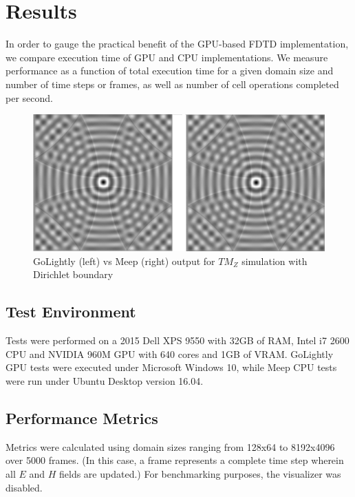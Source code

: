 \chapter{Results} \label{ch:conclusions}

In order to gauge the practical benefit of the GPU-based FDTD implementation, we compare execution time  of GPU and CPU implementations. We measure performance as a function of total execution time for a given domain size and number of time steps or frames, as well as number of cell operations completed per second. 

\begin{figure}[H]
	\centering
	\includegraphics[width=\textwidth,keepaspectratio]{point-source-comparison-split.jpg}
	\caption{GoLightly (left) vs Meep (right) output for ${TM}_Z$ simulation with Dirichlet boundary}
	\label{fig:pointSourceComparison}
\end{figure}

\section{Test Environment}

Tests were performed on a 2015 Dell XPS 9550 with 32GB of RAM, Intel i7 2600 CPU and NVIDIA 960M GPU with 640 cores and 1GB of VRAM. GoLightly GPU tests were executed under Microsoft Windows 10, while Meep CPU tests were run under Ubuntu Desktop version 16.04.
 

\section{Performance Metrics}

Metrics were calculated using domain sizes ranging from 128x64 to 8192x4096 over 5000 frames. (In this case, a frame represents a complete time step wherein all $E$ and $H$ fields are updated.) For benchmarking purposes, the visualizer was disabled.


